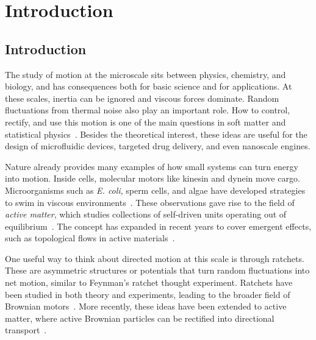


\part{Introduction}
\label{part:introduction}

\chapter{Introduction}
\label{ch:introduction}

The study of motion at the microscale sits between physics, chemistry, and biology, and has consequences both for basic science and for applications. At these scales, inertia can be ignored and viscous forces dominate. Random fluctuations from thermal noise also play an important role. How to control, rectify, and use this motion is one of the main questions in soft matter and statistical physics~\cite{purcell2014life,einstein1906theory}. Besides the theoretical interest, these ideas are useful for the design of microfluidic devices, targeted drug delivery, and even nanoscale engines.

Nature already provides many examples of how small systems can turn energy into motion. Inside cells, molecular motors like kinesin and dynein move cargo. Microorganisms such as \textit{E. coli}, sperm cells, and algae have developed strategies to swim in viscous environments~\cite{howard2002mechanics, vale2003molecular, marchetti2013hydrodynamics}. These observations gave rise to the field of \textit{active matter}, which studies collections of self-driven units operating out of equilibrium~\cite{ramaswamy2010mechanics, needleman2017active, bechinger2016active}. The concept has expanded in recent years to cover emergent effects, such as topological flows in active materials~\cite{shankar2022topological}.

One useful way to think about directed motion at this scale is through ratchets. These are asymmetric structures or potentials that turn random fluctuations into net motion, similar to Feynman’s ratchet thought experiment. Ratchets have been studied in both theory and experiments, leading to the broader field of Brownian motors~\cite{julicher1997modeling, reimann2002brownian}. More recently, these ideas have been extended to active matter, where active Brownian particles can be rectified into directional transport~\cite{fiasconaro2008active, reichhardt2017ratchet, rein2023force}.

